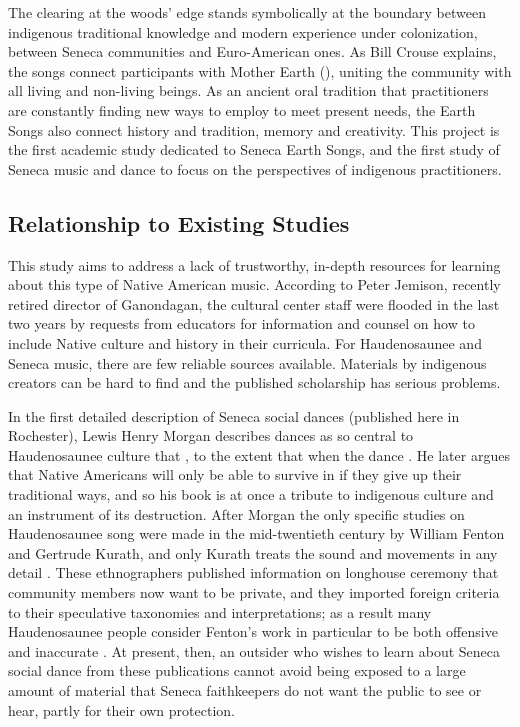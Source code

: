 \documentclass{neh}
\begin{document}
The clearing at the woods' edge stands symbolically at the boundary between
indigenous traditional knowledge and modern experience under colonization,
between Seneca communities and Euro-American ones.
As Bill Crouse explains, the songs connect participants with Mother Earth
(), uniting the community with all living and
non-living beings.
As an ancient oral tradition that practitioners are constantly finding new
ways to employ to meet present needs, the Earth Songs also connect history and
tradition, memory and creativity.
This project is the first academic study dedicated to Seneca Earth Songs, and
the first study of Seneca music and dance to focus on the perspectives of
indigenous practitioners.

\subsection{Relationship to Existing Studies}

This study aims to address a lack of trustworthy, in-depth resources for
learning about this type of Native American music.
According to Peter Jemison, recently retired director of Ganondagan, the
cultural center staff were flooded in the last two years by requests from
educators for information and counsel on how to include Native culture and
history in their curricula.
For Haudenosaunee and Seneca music, there are few reliable sources available.
Materials by indigenous creators can be hard to find and the published
scholarship has serious problems.

In the first detailed description of Seneca social dances (published here in
Rochester), Lewis Henry Morgan describes dances as so central to Haudenosaunee
culture that , to the extent that when the dance 
\Autocite[261, 263]{Morgan:League}.
He later argues that Native Americans will only be able to survive in
 if they give up their traditional ways, and so his book
is at once a tribute to indigenous culture and an instrument of its
destruction.
After Morgan the only specific studies on Haudenosaunee song were made in the
mid-twentieth century by William Fenton and Gertrude Kurath, and only Kurath
treats the sound and movements in any detail
\Autocites{FentonKurath:EagleDance}{Kurath:IroquoisMusic}{Caldwell:Kurath}.
These ethnographers published information on longhouse ceremony that community
members now want to be private, and they imported foreign criteria to their
speculative taxonomies and interpretations; as a result many Haudenosaunee
people consider Fenton's work in particular to be both offensive and
inaccurate
\Autocite{McCarthy:Iroquoianist}.
At present, then, an outsider who wishes to learn about Seneca social dance
from these publications cannot avoid being exposed to a large amount of
material that Seneca faithkeepers do not want the public to see or hear,
partly for their own protection.
\end{document}
